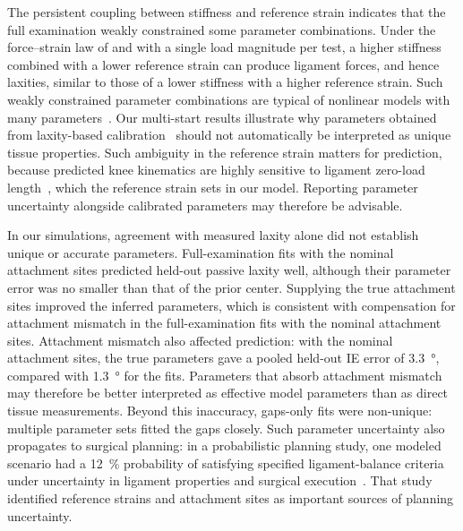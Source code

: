 The persistent coupling between stiffness and reference strain indicates that the full examination weakly constrained some parameter combinations.
Under the force--strain law of \textcite{blankevoort1991ligament} and with a single load magnitude per test, a higher stiffness combined with a lower reference strain can produce ligament forces, and hence laxities, similar to those of a lower stiffness with a higher reference strain.
Such weakly constrained parameter combinations are typical of nonlinear models with many parameters~\autocite{gutenkunst2007universally,raue2009structural,transtrum2015perspective}.
Our multi-start results illustrate why parameters obtained from laxity-based calibration~\autocite{harris2016combined,ewing2016estimating} should not automatically be interpreted as unique tissue properties.
Such ambiguity in the reference strain matters for prediction, because predicted knee kinematics are highly sensitive to ligament zero-load length~\autocite{bloemker2012computational}, which the reference strain sets in our model.
Reporting parameter uncertainty alongside calibrated parameters may therefore be advisable.

In our simulations, agreement with measured laxity alone did not establish unique or accurate parameters.
Full-examination fits with the nominal attachment sites predicted held-out passive laxity well, although their parameter error was no smaller than that of the prior center.
Supplying the true attachment sites improved the inferred parameters, which is consistent with compensation for attachment mismatch in the full-examination fits with the nominal attachment sites.
Attachment mismatch also affected prediction: with the nominal attachment sites, the true parameters gave a pooled held-out IE error of \SI{3.3}{\degree}, compared with \SI{1.3}{\degree} for the fits.
Parameters that absorb attachment mismatch may therefore be better interpreted as effective model parameters than as direct tissue measurements.
Beyond this inaccuracy, gaps-only fits were non-unique: multiple parameter sets fitted the gaps closely.
Such parameter uncertainty also propagates to surgical planning: in a probabilistic planning study, one modeled scenario had a \SI{12}{\percent} probability of satisfying specified ligament-balance criteria under uncertainty in ligament properties and surgical execution~\autocite{bartsoen2022probabilistic}.
That study identified reference strains and attachment sites as important sources of planning uncertainty.

